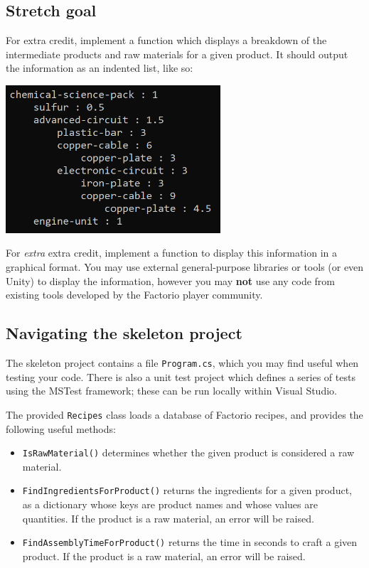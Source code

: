 \documentclass{../../../fal_assignment}
\begin{document}
\subsection*{Stretch goal}

For extra credit, implement a function which displays a breakdown of the intermediate products and raw materials for a given product.
It should output the information as an indented list, like so:

\begin{center}
	\includegraphics[width=0.6\textwidth]{stretch-goal}
\end{center}

For \emph{extra} extra credit, implement a function to display this information in a graphical format.
You may use external general-purpose libraries or tools (or even Unity) to display the information,
however you may \textbf{not} use any code from existing tools developed by the Factorio player community.

\subsection*{Navigating the skeleton project}

The skeleton project contains a file \texttt{Program.cs}, which you may find useful when testing your code.
There is also a unit test project which defines a series of tests using the MSTest framework;
these can be run locally within Visual Studio.

The provided \lstinline{Recipes} class loads a database of Factorio recipes, and provides the following useful methods:
\begin{itemize}
	\item \lstinline{IsRawMaterial()} determines whether the given product is considered a raw material.
	\item \lstinline{FindIngredientsForProduct()} returns the ingredients for a given product, as a dictionary
		whose keys are product names and whose values are quantities.
		If the product is a raw material, an error will be raised.
    \item \lstinline{FindAssemblyTimeForProduct()} returns the time in seconds to craft a given product.
		If the product is a raw material, an error will be raised.
\end{itemize}
\end{document}
